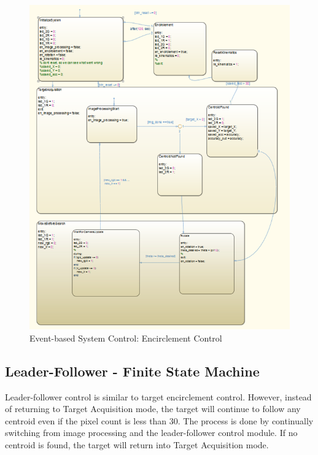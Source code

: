 \begin{figure}[htbp]
\begin{center}
\includegraphics[width=5in]{9}
\caption{Event-based System Control: Encirclement Control} \label{fig:9}
\end{center}
\end{figure}

\subsection{Leader-Follower - Finite State Machine}

Leader-follower control is similar to target encirclement control. However, instead of returning to Target Acquisition mode, the target will continue to follow any centroid even if the pixel count is less than 30. The process is done by continually switching from image processing and the leader-follower control module. If no centroid is found, the target will return into Target Acquisition mode.


